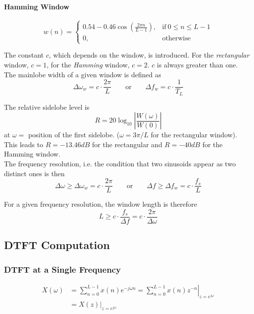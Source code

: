 \paragraph{Hamming Window}
	\begin{equation*}
		w(n) = \begin{cases}
			0.54-0.46 \cos\left(\frac{2 \pi n}{L-1}\right), & \text{if} \: 0 \leq n \leq L-1 \\
			0, & \text{otherwise}
		\end{cases}
	\end{equation*}

The constant $c$, which depends on the window, is introduced. For the
\emph{rectangular} window, $c=1$, for the \emph{Hamming} window, $c=2$.
$c$ is always greater than one. \\

The mainlobe width of a given window is defined as
\begin{equation*}
	\Delta\omega_w = c \cdot \frac{2 \pi}{L} \qquad \text{or} \qquad \Delta f_w = c \cdot \frac{1}{T_L}
\end{equation*}

The relative sidelobe level is
\begin{equation*}
	R = 20 \log_{10} \left| \frac{W(\omega)}{W(0)} \right|
\end{equation*}
at $\omega = $ position of the first sidelobe. ($\omega=3\pi/L$ for the
rectangular window). This leads to $R = -13.46 dB$ for the rectangular
and $R = -40 dB$ for the Hamming window. \\

The frequency resolution, i.e. the condition that two sinusoids appear as
two distinct ones is then
\begin{equation*}
	 \Delta\omega \geq \Delta\omega_w = c \cdot \frac{2 \pi}{L}\qquad \text{or} \qquad \Delta f \geq \Delta f_w = c \cdot \frac{f_s}{L}
\end{equation*}

For a given frequency resolution, the window length is therefore
\begin{equation*}
	L \geq c \cdot \frac{f_s}{\Delta f} = c \cdot \frac{2 \pi}{\Delta \omega}
\end{equation*}

\subsection{DTFT Computation}

\subsubsection{DTFT at a Single Frequency}
\begin{align*}
X(\omega) & = \sum_{n=0}^{L-1}x(n)e^{-j\omega n}
 	  = \left.\sum_{n=0}^{L-1}x(n)z^{-n}\right|_{z=e^{j\omega}} \\
	& = \left. X(z)\right|_{z=e^{j\omega}}
\end{align*}

